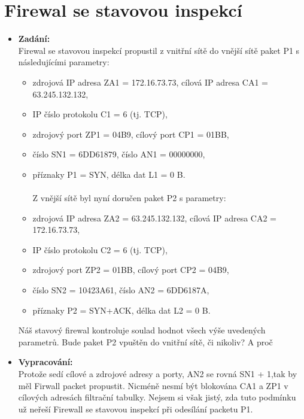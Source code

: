 \documentclass[10pt, a4paper]{article}%
\begin{document}
	\section*{\large{\textbf{Firewal se stavovou inspekcí}}}
		\begin{itemize}[label={}]
			\item \textbf{Zadání:}\\
			Firewal se stavovou inspekcí propustil z vnitřní sítě do vnější sítě paket P1 s následujícími
			parametry: \\
			\begin{itemize}
				\item zdrojová IP adresa ZA1 = 172.16.73.73, cílová IP adresa CA1 = 63.245.132.132,
				\item IP číslo protokolu C1 = 6 (tj. TCP),
				\item zdrojový port ZP1 = 04B9, cílový port CP1 = 01BB,
				\item číslo SN1 = 6DD61879, číslo AN1 = 00000000,
				\item příznaky P1 = SYN, délka dat L1 = 0 B.\\\\
				Z vnější sítě byl nyní doručen paket P2 s parametry: 
				\item zdrojová IP adresa ZA2 = 63.245.132.132, cílová IP adresa CA2 = 172.16.73.73,
				\item IP číslo protokolu C2 = 6 (tj. TCP),
				\item zdrojový port ZP2 = 01BB, cílový port CP2 = 04B9,
				\item číslo SN2 = 10423A61, číslo AN2 = 6DD6187A,
				\item příznaky P2 = SYN+ACK, délka dat L2 = 0 B.
			\end{itemize}


			Náš stavový firewal kontroluje soulad hodnot všech výše uvedených parametrů. Bude paket P2 
			vpuštěn do vnitřní sítě, či nikoliv? A proč 


			\item \textbf{Vypracování:}\\
			Protože sedí cílové a zdrojové adresy a porty, AN2 se rovná SN1 + 1,tak by měl Firwall packet propustit.
			Nicméně nesmí být blokována CA1 a ZP1 v cílových adresách filtrační tabulky. Nejsem si však jistý, zda tuto
			podmínku už neřeší Firewall se stavovou inspekcí při odesílání packetu P1.

		\end{itemize}
\end{document}
